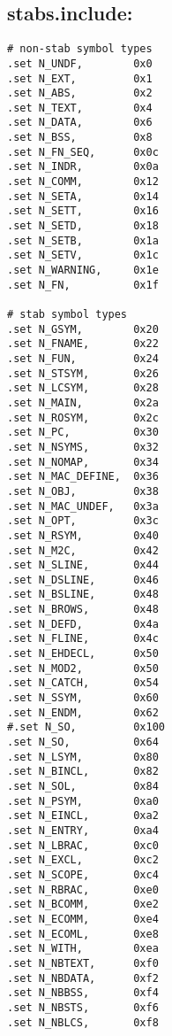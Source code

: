 \subsection{stabs.include:}
\label{anhang:stabs.include}
\begin{lstlisting}
# non-stab symbol types
.set N_UNDF,		0x0
.set N_EXT,			0x1
.set N_ABS,			0x2
.set N_TEXT,		0x4
.set N_DATA,		0x6
.set N_BSS,			0x8
.set N_FN_SEQ,		0x0c
.set N_INDR,		0x0a
.set N_COMM,		0x12
.set N_SETA,		0x14
.set N_SETT,		0x16
.set N_SETD,		0x18
.set N_SETB,		0x1a
.set N_SETV,		0x1c
.set N_WARNING,		0x1e
.set N_FN,			0x1f

# stab symbol types
.set N_GSYM,		0x20
.set N_FNAME,		0x22
.set N_FUN,			0x24
.set N_STSYM,		0x26
.set N_LCSYM,		0x28
.set N_MAIN,		0x2a
.set N_ROSYM,		0x2c
.set N_PC,			0x30
.set N_NSYMS,		0x32
.set N_NOMAP,		0x34
.set N_MAC_DEFINE,	0x36
.set N_OBJ,			0x38
.set N_MAC_UNDEF,	0x3a
.set N_OPT,			0x3c
.set N_RSYM,		0x40
.set N_M2C,			0x42
.set N_SLINE,		0x44
.set N_DSLINE,		0x46
.set N_BSLINE,		0x48
.set N_BROWS,		0x48
.set N_DEFD,		0x4a
.set N_FLINE,		0x4c
.set N_EHDECL,		0x50
.set N_MOD2,		0x50
.set N_CATCH,		0x54
.set N_SSYM,		0x60
.set N_ENDM,		0x62
#.set N_SO,			0x100
.set N_SO,			0x64
.set N_LSYM,		0x80
.set N_BINCL,		0x82
.set N_SOL,			0x84
.set N_PSYM,		0xa0
.set N_EINCL,		0xa2
.set N_ENTRY,		0xa4
.set N_LBRAC,		0xc0
.set N_EXCL,		0xc2
.set N_SCOPE,		0xc4
.set N_RBRAC,		0xe0
.set N_BCOMM,		0xe2
.set N_ECOMM,		0xe4
.set N_ECOML,		0xe8
.set N_WITH,		0xea
.set N_NBTEXT,		0xf0
.set N_NBDATA,		0xf2
.set N_NBBSS,		0xf4
.set N_NBSTS,		0xf6
.set N_NBLCS,		0xf8
\end{lstlisting}

